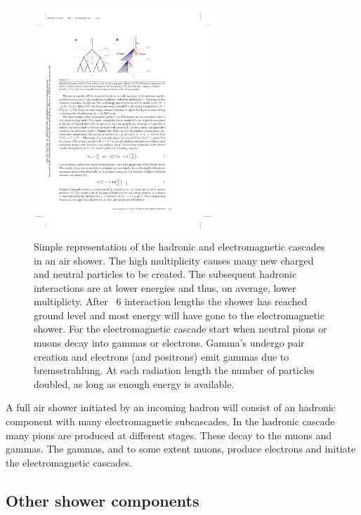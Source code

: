 \begin{figure}
    \centering
    \includegraphics[width=0.6\textwidth]
                    {plots/cosmic-rays/schematic_shower}
    \caption{Simple representation of the hadronic and electromagnetic cascades in an air shower. The high multiplicity causes many new charged and neutral particles to be created. The subsequent hadronic interactions are at lower energies and thus, on average, lower multiplicty. After ~6 interaction lengths the shower has reached ground level and most energy will have gone to the electromagnetic shower. For the electromagnetic cascade start when neutral pions or muons decay into gammas or electrons. Gamma's undergo pair creation and electrons (and positrons) emit gammas due to bremsstrahlung. At each radiation length the number of particles doubled, as long as enough energy is available. \cite{engel2011eas}}
    \label{fig:schematic_shower}
\end{figure}

A full air shower initiated by an incoming hadron will consist of an hadronic component with many electromagnetic subcascades. In the hadronic cascade many pions are produced at different stages. These decay to the muons and gammas. The gammas, and to some extent muons, produce electrons and initiate the electromagnetic cascades.


\subsection{Other shower components}
\label{sec:other_observables}


